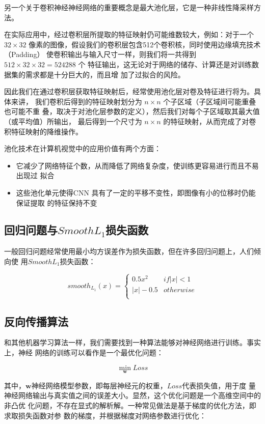 另一个关于卷积神经神经网络的重要概念是最大池化层，它是一种非线性降采样方法。

在实际应用中，经过卷积层所提取的特征映射仍可能维数较大，例如：对于一个 $32 \times
32$ 像素的图像，假设我们的卷积层包含512个卷积核，同时使用边缘填充技术（Padding）
使卷积输出与输入尺寸一样，则我们将一共得到 $512 \times 32 \times 32 = 524288$ 个
特征输出，这无论对于网络的储存、计算还是对训练数据集的需求都是十分巨大的，而且增
加了过拟合的风险。

因此我们在通过卷积层获取特征映射后，经常使用池化层对卷及特征进行将为。具体来讲，
我们卷积后得到的特征映射划分为 $n \times n$ 个子区域（子区域间可能重叠也可能不重
叠，取决于对池化层参数的定义），然后我们对每个子区域取其最大值（或平均值）所输出，
最后得到一个尺寸为 $n \times n$ 的特征映射，从而完成了对卷积特征映射的降维操作。

池化技术在计算机视觉中的应用价值有两个方面：

\begin{itemize}
\item 它减少了网络特征个数，从而降低了网络复杂度，使训练更容易进行而且不易出现过
  拟合
\item 这些池化单元使得CNN 具有了一定的平移不变性，即图像有小的位移时仍能保证提取
  的特征保持不变
\end{itemize}

\subsection{回归问题与$Smooth L_1$损失函数}

一般回归问题经常使用最小均方误差作为损失函数，但在许多回归问题上，人们倾向使
用$Smooth L_1$损失函数：

\[
smooth_{L_1}(x) = 
\begin{cases}
0.5x^2 & if |x| < 1 \\
|x| - 0.5 & otherwise \\
\end{cases}
\]

\subsection{反向传播算法}

和其他机器学习算法一样，我们需要找到一种算法能够对神经网络进行训练。事实上，神经
网络的训练可以看作是一个最优化问题：

\[
\min_{\mathbf{w}}{Loss}
\]

其中，$\mathbf{w}$神经网络模型参数，即每层神经元的权重，$Loss$代表损失值，用于度
量神经网络输出与真实值之间的误差大小。显然，这个优化问题是一个高维空间中的非凸优
化问题，不存在显式的解析解。一种常见做法是基于梯度的优化方法，即求取损失函数对参
数的梯度，并根据梯度对网络参数进行优化：

